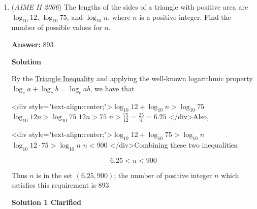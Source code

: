 \begin{enumerate}
\textbf{Solution 3}

Extend lines $AB$ and $CD$ to intersect at $G$ and $AF$ and $DE$ to intersect at $H$. Angles $B$, $C$, $E$, and $F$ are 135 degrees, so minor angles $B$, $C$, $E$, $F$ apart of triangles $G$ and $H$ respectively are 45 degrees. Let $GB = GC = HE = HF = a$, so we have that $AB = BC = \dots = FA = a\sqrt{2}$. The two side lengths of quadrilateral $AGDH$ are equal and the measure in degrees of all figures are 90, so the quadrilateral $AGDH$ is a square. It follows that the side length of this square is $a + a\sqrt{2} = a(\sqrt{2}+1)$, and the area of this figure is $(a(\sqrt{2}+1))^2$. The area of the hexagon is then $(a(\sqrt{2}+1))^2 - a^2$, so we have $a^2((\sqrt{2}+1)^2 - 1) = 2116(\sqrt{2}+1)$, so we have $2a^2(\sqrt{2}+1) = 2116(\sqrt{2}+1)$, then $\sqrt{2}a = 46$, so $a = \frac{46}{\sqrt{2}}$. The side length is $a\sqrt{2}$, so the answer is $\frac{46}{\sqrt{2}} \cdot \sqrt{2} = \boxed{046}$.

 


	\item (\textit{AIME II 2006}) The lengths of the sides of a triangle with positive area are $\log_{10} 12$, $\log_{10} 75$, and $\log_{10} n$, where $n$ is a positive integer. Find the number of possible values for $n$.


 
 \textbf{Answer: }893



\textbf{Solution}

By the \href{https://artofproblemsolving.com/wiki/index.php?title=Triangle\_Inequality}{Triangle Inequality} and applying the well-known logarithmic property $\log_{c} a + \log_{c} b = \log_{c} ab$, we have that

 <div style="text-align:center;">$\log_{10} 12 + \log_{10} n > \log_{10} 75$
$\log_{10} 12n > \log_{10} 75$
$12n > 75$
$n > \frac{75}{12} = \frac{25}{4} = 6.25$
</div>Also, 

 <div style="text-align:center;">$\log_{10} 12 + \log_{10} 75 > \log_{10} n$
$\log_{10} 12\cdot75 > \log_{10} n$
$n < 900$
</div>Combining these two inequalities: 

 
 \[6.25 < n < 900\]

 Thus $n$ is in the set $(6.25 , 900)$; the number of positive integer $n$ which satisfies this requirement is $\boxed{893}$.

 



\textbf{Solution 1 Clarified}


\end{enumerate}
